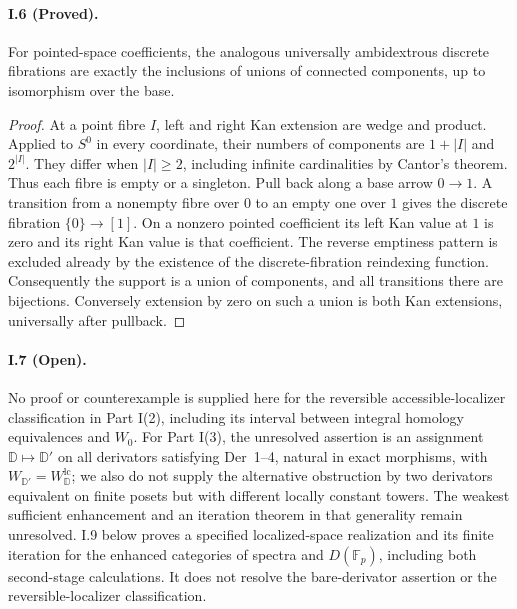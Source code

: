 \paragraph{I.6 (Proved).}
For pointed-space coefficients, the analogous universally
ambidextrous discrete fibrations are exactly the inclusions of
unions of connected components, up to isomorphism over the base.
\begin{proof}
At a point fibre $I$, left and right Kan extension are wedge and
product. Applied to $S^0$ in every coordinate, their numbers of
components are $1+|I|$ and $2^{|I|}$. They differ when $|I|\geq2$,
including infinite cardinalities by Cantor's theorem. Thus each
fibre is empty or a singleton. Pull back along a base arrow
$0\to1$. A transition from a nonempty fibre over $0$ to an
empty one over $1$ gives the discrete fibration $\{0\}\to[1]$.
On a nonzero pointed coefficient its left Kan value at $1$ is
zero and its right Kan value is that coefficient. The reverse
emptiness pattern is excluded already by the existence of the
discrete-fibration reindexing function. Consequently the support
is a union of components, and all transitions there are bijections.
Conversely extension by zero on such a union is both Kan
extensions, universally after pullback.
\end{proof}


\paragraph{I.7 (Open).}
No proof or counterexample is supplied here for the reversible
accessible-localizer classification in Part I(2), including its
interval between integral homology equivalences and $W_0$.
For Part I(3), the unresolved assertion is an assignment
$\mathbb D\mapsto\mathbb D'$ on all derivators satisfying
Der~1--4, natural in exact morphisms, with
$W_{\mathbb D'}=W_{\mathbb D}^{\mathrm{lc}}$; we also do not
supply the alternative obstruction by two derivators equivalent
on finite posets but with different locally constant towers.
The weakest sufficient enhancement and an iteration theorem in
that generality remain unresolved. I.9 below proves a specified
localized-space realization and its finite iteration for the
enhanced categories of spectra and $D(\mathbb F_p)$, including
both second-stage calculations. It does not resolve the
bare-derivator assertion or the reversible-localizer classification.


